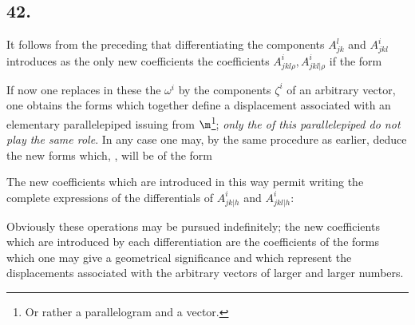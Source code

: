 \subsection*{42.}

It follows from the preceding that differentiating the components $A_{jk}^l$ and $A_{jkl}^i$ introduces as the only new coefficients the coefficients $A_{jkl\rho}^i, A_{jkl | \rho}^i$ if the form

If now one replaces in these  the $\omega^i$ by the components $\zeta^i$ of an arbitrary vector, one obtains the forms
which together define a displacement associated with an elementary parallelepiped issuing from $\m$\footnote{Or rather a parallelogram and a vector.}; \textit{only the  of this parallelepiped do not play the same role}. In any case one may, by the same procedure as earlier, deduce the new forms
which, , will be of the form

The new coefficients which are introduced in this way permit writing the complete expressions of the differentials of $A_{jk| h}^i$ and $A_{jkl| h}^i$:

Obviously these operations may be pursued indefinitely; the new coefficients which are introduced by each differentiation are the coefficients of the forms which one may give a geometrical significance and which represent the displacements associated with the arbitrary vectors of larger and larger numbers.  